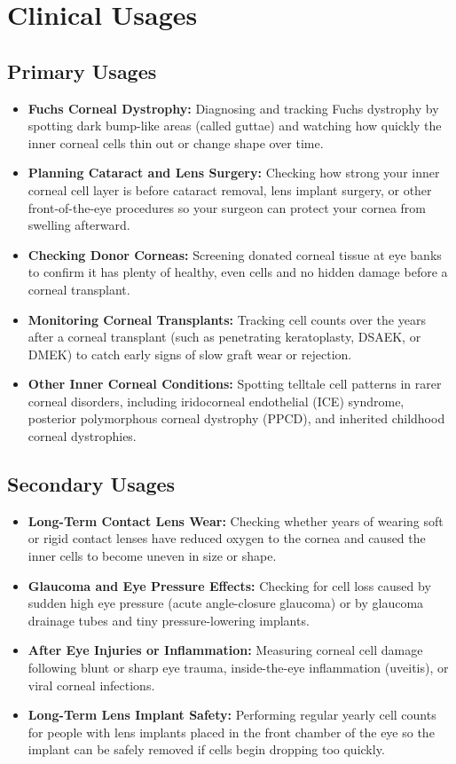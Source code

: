\section{Clinical Usages}

\subsection{Primary Usages}

\begin{itemize}
    \item \textbf{Fuchs Corneal Dystrophy:} Diagnosing and tracking Fuchs dystrophy by spotting dark bump-like areas (called guttae) and watching how quickly the inner corneal cells thin out or change shape over time.
    \item \textbf{Planning Cataract and Lens Surgery:} Checking how strong your inner corneal cell layer is before cataract removal, lens implant surgery, or other front-of-the-eye procedures so your surgeon can protect your cornea from swelling afterward.
    \item \textbf{Checking Donor Corneas:} Screening donated corneal tissue at eye banks to confirm it has plenty of healthy, even cells and no hidden damage before a corneal transplant.
    \item \textbf{Monitoring Corneal Transplants:} Tracking cell counts over the years after a corneal transplant (such as penetrating keratoplasty, DSAEK, or DMEK) to catch early signs of slow graft wear or rejection.
    \item \textbf{Other Inner Corneal Conditions:} Spotting telltale cell patterns in rarer corneal disorders, including iridocorneal endothelial (ICE) syndrome, posterior polymorphous corneal dystrophy (PPCD), and inherited childhood corneal dystrophies.
\end{itemize}

\subsection{Secondary Usages}

\begin{itemize}
    \item \textbf{Long-Term Contact Lens Wear:} Checking whether years of wearing soft or rigid contact lenses have reduced oxygen to the cornea and caused the inner cells to become uneven in size or shape.
    \item \textbf{Glaucoma and Eye Pressure Effects:} Checking for cell loss caused by sudden high eye pressure (acute angle-closure glaucoma) or by glaucoma drainage tubes and tiny pressure-lowering implants.
    \item \textbf{After Eye Injuries or Inflammation:} Measuring corneal cell damage following blunt or sharp eye trauma, inside-the-eye inflammation (uveitis), or viral corneal infections.
    \item \textbf{Long-Term Lens Implant Safety:} Performing regular yearly cell counts for people with lens implants placed in the front chamber of the eye so the implant can be safely removed if cells begin dropping too quickly.
\end{itemize}

